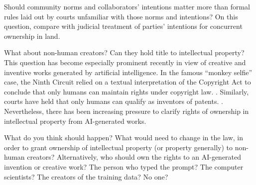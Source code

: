 Should community norms and collaborators' intentions matter more than formal
rules laid out by courts unfamiliar with those norms and intentions? On this
question, compare with judicial treatment of parties' intentions for concurrent
ownership in land.







\item
\label{n:ai-creator}
What about non-human creators? Can they hold title to intellectual
property? This question has become especially prominent recently in view of
creative and inventive works generated by artificial intelligence. In the famous
``monkey selfie'' case, the Ninth Circuit relied on a textual interpretation of
the Copyright Act to conclude that only humans can maintain rights under
copyright law. . Similarly, courts have
held that only humans can qualify as inventors of patents. .
Nevertheless, there has
been increasing pressure to clarify rights of ownership in intellectual
property from AI-generated works. 

What do you think should happen? What would need to change in the law, in order
to grant ownership of intellectual property (or property generally) to non-human
creators? Alternatively, who should own the rights to an AI-generated invention
or creative work? The person who typed the prompt? The computer scientists? The
creators of the training data? No one?


